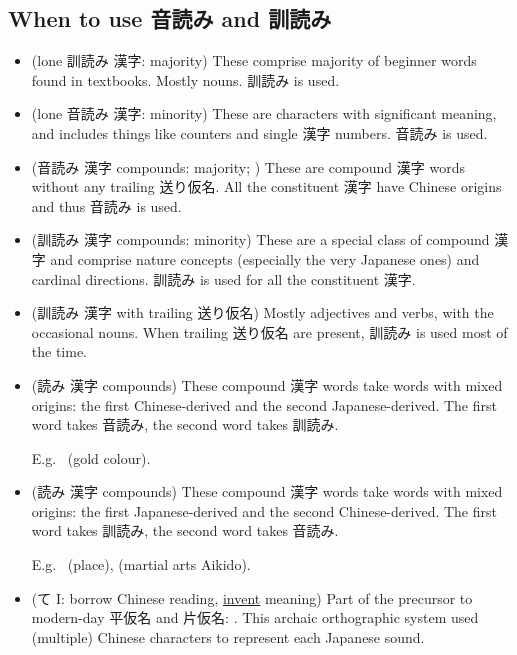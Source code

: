 \documentclass[../nihongo-gakushuu-kyouzai.tex]{subfiles}
\begin{document}
\subsection{When to use 音読み and 訓読み}

\begin{itemize}
    \item (lone 訓読み 漢字: majority) These comprise majority of beginner words found in textbooks. Mostly nouns. 訓読み is used.

    \item (lone 音読み 漢字: minority) These are characters with significant meaning, and includes things like counters and single 漢字 numbers. 音読み is used.

    \item (音読み 漢字 compounds: majority; ) These are compound 漢字 words without any trailing 送り仮名. All the constituent 漢字 have Chinese origins and thus 音読み is used.

    \item (訓読み 漢字 compounds: minority) These are a special class of compound 漢字 and comprise nature concepts (especially the very Japanese ones) and cardinal directions. 訓読み is used for all the constituent 漢字.

    \item (訓読み 漢字 with trailing 送り仮名) Mostly adjectives and verbs, with the occasional nouns. When trailing 送り仮名 are present, 訓読み is used most of the time.

    \item (読み 漢字 compounds) These compound 漢字 words take words with mixed origins: the first Chinese-derived and the second Japanese-derived. The first word takes 音読み, the second word takes 訓読み.

    E.g.\  (gold colour).

    \item (読み 漢字 compounds) These compound 漢字 words take words with mixed origins: the first Japanese-derived and the second Chinese-derived. The first word takes 訓読み, the second word takes 音読み.

    E.g.\  (place),  (martial arts Aikido).

    \item (て I: borrow Chinese reading, \ul{invent} meaning) Part of the precursor to modern-day 平仮名 and 片仮名: . This archaic orthographic system used (multiple) Chinese characters to represent each Japanese sound.


\end{itemize}
\end{document}
